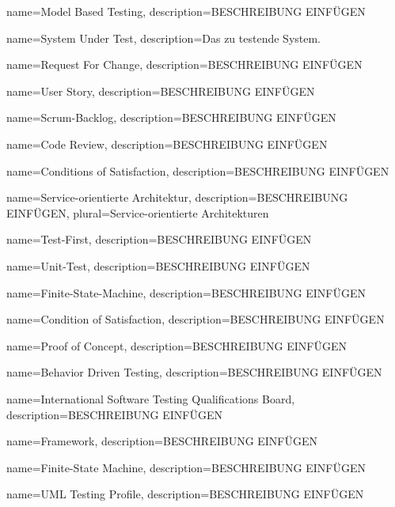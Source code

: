  {
	name={Model Based Testing},
	description={BESCHREIBUNG EINFÜGEN}
}

 {
	name={System Under Test},
	description={Das zu testende System.}
}

 {
	name={Request For Change},
	description={BESCHREIBUNG EINFÜGEN}
}

 {
	name={User Story},
	description={BESCHREIBUNG EINFÜGEN}
}

 {
	name={Scrum-Backlog},
	description={BESCHREIBUNG EINFÜGEN}
}

 {
	name={Code Review},
	description={BESCHREIBUNG EINFÜGEN}
}

 {
	name={Conditions of Satisfaction},
	description={BESCHREIBUNG EINFÜGEN}
}

 {
	name={Service-orientierte Architektur},
	description={BESCHREIBUNG EINFÜGEN},
	plural={Service-orientierte Architekturen}
}


 {
	name={Test-First},
	description={BESCHREIBUNG EINFÜGEN}
}

 {
	name={Unit-Test},
	description={BESCHREIBUNG EINFÜGEN}
}

 {
	name={Finite-State-Machine},
	description={BESCHREIBUNG EINFÜGEN}
}

 {
	name={Condition of Satisfaction},
	description={BESCHREIBUNG EINFÜGEN}
}

 {
	name={Proof of Concept},
	description={BESCHREIBUNG EINFÜGEN}
}

 {
	name={Behavior Driven Testing},
	description={BESCHREIBUNG EINFÜGEN}
}

 {
	name={International Software Testing Qualifications Board},
	description={BESCHREIBUNG EINFÜGEN}
}

 {
	name={Framework},
	description={BESCHREIBUNG EINFÜGEN}
}

 {
	name={Finite-State Machine},
	description={BESCHREIBUNG EINFÜGEN}
}

 {
	name={UML Testing Profile},
	description={BESCHREIBUNG EINFÜGEN}
}